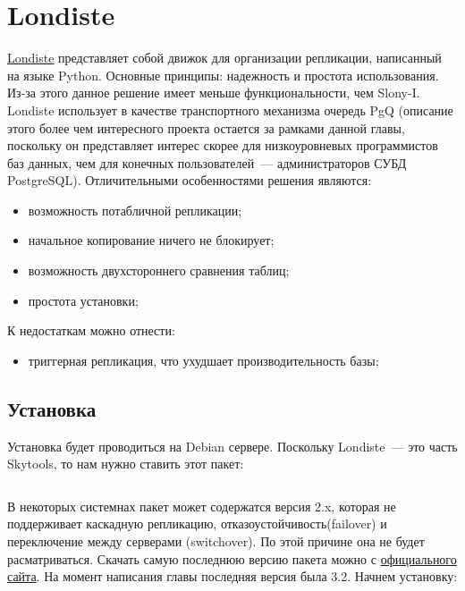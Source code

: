 \section{Londiste}
\label{sec:londiste}

\href{http://pgfoundry.org/projects/skytools}{Londiste} представляет собой движок для организации репликации, написанный на языке Python. Основные принципы: надежность и простота использования. Из-за этого данное решение имеет меньше функциональности, чем Slony-I. Londiste использует в качестве транспортного механизма очередь PgQ (описание этого более чем интересного проекта остается за рамками данной главы, поскольку он представляет интерес скорее для низкоуровневых программистов баз данных, чем для конечных пользователей~--- администраторов СУБД PostgreSQL). Отличительными особенностями решения являются:

\begin{itemize}
  \item возможность потабличной репликации;
  \item начальное копирование ничего не блокирует;
  \item возможность двухстороннего сравнения таблиц;
  \item простота установки;
\end{itemize}

К недостаткам можно отнести:

\begin{itemize}
  \item триггерная репликация, что ухудшает производительность базы;
\end{itemize}


\subsection{Установка}

Установка будет проводиться на Debian сервере. Поскольку Londiste~--- это часть Skytools, то нам нужно ставить этот пакет:

\begin{lstlisting}[label=lst:londiste1,caption=Установка]
% sudo aptitude install skytools
\end{lstlisting}

В некоторых системнах пакет может содержатся версия 2.x, которая не поддерживает каскадную репликацию, отказоустойчивость(failover) и переключение между серверами (switchover). По этой причине она не будет расматриваться. Скачать самую последнюю версию пакета можно с \href{http://pgfoundry.org/projects/skytools}{официального сайта}. На момент написания главы последняя версия была 3.2. Начнем установку:


